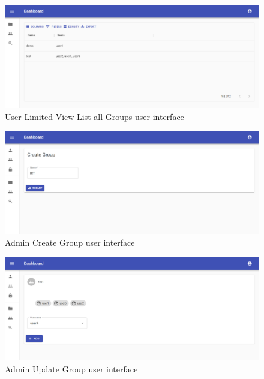 \begin{figure}[H]
    \centering
    \includegraphics[width=1.0\textwidth]{images/Group-List-Limited-For-User.png}
    \caption{User Limited View List all Groups user interface}
    \label{fig:userListAllGroups}
\end{figure}
\begin{figure}[H]
    \centering
    \includegraphics[width=1.0\textwidth]{images/Group-Create.png}
    \caption{Admin Create Group user interface}
    \label{fig:adminCreateGroup}
\end{figure}
\begin{figure}[H]
    \centering
    \includegraphics[width=1.0\textwidth]{images/Group-Add-User.png}
    \caption{Admin Update Group user interface}
    \label{fig:adminUpdateGroup}
\end{figure}

